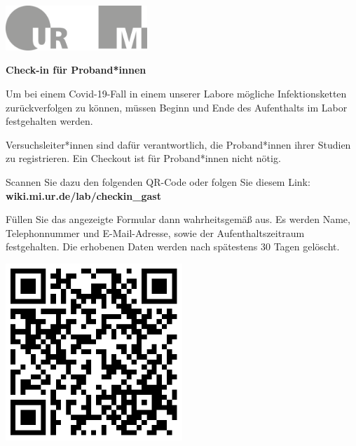 \documentclass[24pt, a4paper, portrait]{article}
\begin{document}
\pagestyle{empty}

\raggedleft

\includegraphics[width=0.4\textwidth]{logo}

\vspace{1cm}
\sffamily
\centering
\huge

\textbf{Check-in für Proband*innen}

\vspace{1cm}

\raggedright
\Large

Um bei einem Covid-19-Fall in einem unserer Labore mögliche Infektionsketten zurückverfolgen zu können, müssen Beginn und Ende des Aufenthalts im Labor festgehalten werden.

Versuchsleiter*innen sind dafür verantwortlich, die Proband*innen ihrer Studien zu registrieren.
Ein Checkout ist für Proband*innen nicht nötig.

\medskip

Scannen Sie dazu den folgenden QR-Code oder folgen Sie diesem Link: \textbf{wiki.mi.ur.de/lab/checkin\_gast}

\medskip

Füllen Sie das angezeigte Formular dann wahrheitsgemäß aus.
Es werden Name, Telephonnummer und E-Mail-Adresse, sowie der Aufenthaltszeitraum festgehalten.
Die erhobenen Daten werden nach spätestens 30 Tagen gelöscht.

\vspace{1cm}
\centering
\includegraphics[width=0.5\textwidth]{qr/vr4_labor_checkin_gast}
\end{document}
